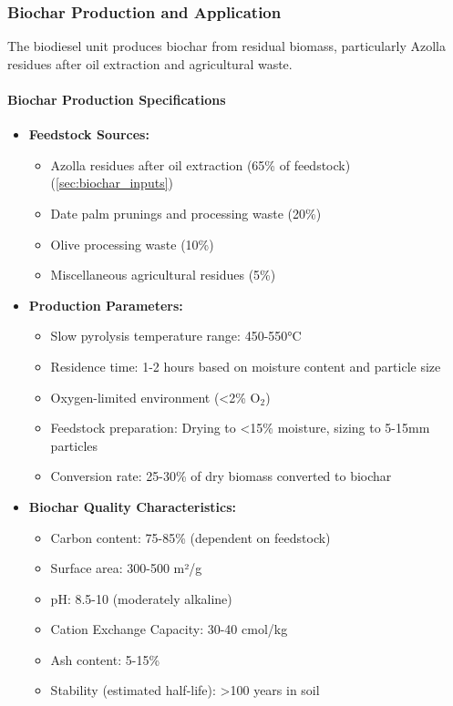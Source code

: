 \subsubsection{Biochar Production and Application}
\label{sec:biochar_production}

The biodiesel unit produces biochar from residual biomass, particularly Azolla residues after oil extraction and agricultural waste.

\paragraph{Biochar Production Specifications}
\begin{itemize}
    \item \textbf{Feedstock Sources:}
    \begin{itemize}
        \item Azolla residues after oil extraction (65\% of feedstock) (\ref{sec:biochar_inputs})
        \item Date palm prunings and processing waste (20\%)
        \item Olive processing waste (10\%)
        \item Miscellaneous agricultural residues (5\%)
    \end{itemize}
    
    \item \textbf{Production Parameters:}
    \begin{itemize}
        \item Slow pyrolysis temperature range: 450-550°C
        \item Residence time: 1-2 hours based on moisture content and particle size
        \item Oxygen-limited environment (<2\% O$_2$)
        \item Feedstock preparation: Drying to <15\% moisture, sizing to 5-15mm particles
        \item Conversion rate: 25-30\% of dry biomass converted to biochar
    \end{itemize}
    
    \item \textbf{Biochar Quality Characteristics:}
    \begin{itemize}
        \item Carbon content: 75-85\% (dependent on feedstock)
        \item Surface area: 300-500 m²/g
        \item pH: 8.5-10 (moderately alkaline)
        \item Cation Exchange Capacity: 30-40 cmol/kg
        \item Ash content: 5-15\%
        \item Stability (estimated half-life): >100 years in soil
    \end{itemize}
\end{itemize}

